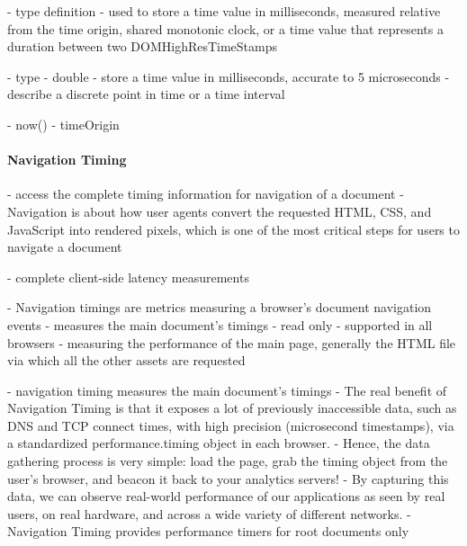 
- type definition
-  used to store a time value in milliseconds, measured relative from the time origin, shared monotonic clock, or a time value that represents a duration between two DOMHighResTimeStamps
	
- type
- double
-  store a time value in milliseconds,  accurate to 5 microseconds
- describe a discrete point in time or a time interval



- now()
- timeOrigin









\paragraph{Navigation Timing}



- access the complete timing information for navigation of a document
- Navigation is about how user agents convert the requested HTML, CSS, and JavaScript into rendered pixels, which is one of the most critical steps for users to navigate a document


- complete client-side latency measurements


- Navigation timings are metrics measuring a browser's document navigation events
- measures the main document's timings
- read only
- supported in all browsers
- measuring the performance of the main page, generally the HTML file via which all the other assets are requested



- navigation timing measures the main document's timings
- The real benefit of Navigation Timing is that it exposes a lot of previously inaccessible data, such as DNS and TCP connect times, with high precision (microsecond timestamps), via a standardized performance.timing object in each browser.
- Hence, the data gathering process is very simple: load the page, grab the timing object from the user’s browser, and beacon it back to your analytics servers!
- By capturing this data, we can observe real-world performance of our applications as seen by real users, on real hardware, and across a wide variety of different networks.
- Navigation Timing provides performance timers for root documents only


